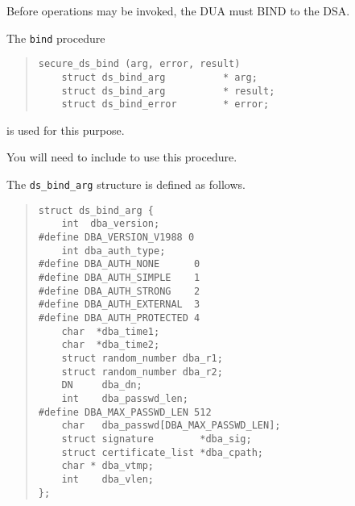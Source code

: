 Before operations may be invoked, the DUA must BIND to the DSA.

The \verb"bind" procedure
\begin{quote}\small\begin{verbatim}
secure_ds_bind (arg, error, result)
    struct ds_bind_arg          * arg;
    struct ds_bind_arg          * result;
    struct ds_bind_error        * error;
\end{verbatim}\end{quote}
is used for this purpose.

You will need to include  to use this procedure.

The \verb"ds_bind_arg" structure is defined as follows.
\begin{quote}\small\begin{verbatim}
struct ds_bind_arg {
    int  dba_version; 
#define DBA_VERSION_V1988 0
    int dba_auth_type;
#define DBA_AUTH_NONE      0
#define DBA_AUTH_SIMPLE    1
#define DBA_AUTH_STRONG    2
#define DBA_AUTH_EXTERNAL  3
#define DBA_AUTH_PROTECTED 4
    char  *dba_time1;
    char  *dba_time2;
    struct random_number dba_r1;
    struct random_number dba_r2;
    DN     dba_dn;
    int    dba_passwd_len;
#define DBA_MAX_PASSWD_LEN 512
    char   dba_passwd[DBA_MAX_PASSWD_LEN];
    struct signature        *dba_sig;
    struct certificate_list *dba_cpath;
    char * dba_vtmp;
    int    dba_vlen;
};
\end{verbatim}\end{quote}

